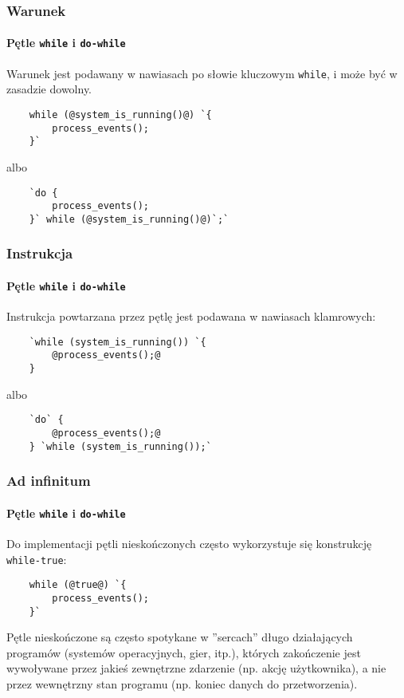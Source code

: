 \documentclass[aspectratio=169]{beamer}
\begin{document}
\begin{frame}[fragile]
    \frametitle{Warunek}
    \framesubtitle{Pętle {\tt while} i {\tt do-while}}

    Warunek jest podawany w nawiasach po słowie kluczowym {\tt while}, i może
    być w zasadzie dowolny.

    \begin{lstlisting}
    while (@system_is_running()@) `{
        process_events();
    }`
    \end{lstlisting}

    albo

    \begin{lstlisting}
    `do {
        process_events();
    }` while (@system_is_running()@)`;`
    \end{lstlisting}
\end{frame}

\begin{frame}[fragile]
    \frametitle{Instrukcja}
    \framesubtitle{Pętle {\tt while} i {\tt do-while}}

    Instrukcja powtarzana przez pętlę jest podawana w nawiasach klamrowych:

    \begin{lstlisting}
    `while (system_is_running()) `{
        @process_events();@
    }
    \end{lstlisting}

    albo

    \begin{lstlisting}
    `do` {
        @process_events();@
    } `while (system_is_running());`
    \end{lstlisting}
\end{frame}

\begin{frame}[fragile]
    \frametitle{Ad infinitum}
    \framesubtitle{Pętle {\tt while} i {\tt do-while}}

    Do implementacji pętli nieskończonych często wykorzystuje się konstrukcję
    {\tt while-true}:

    \begin{lstlisting}
    while (@true@) `{
        process_events();
    }`
    \end{lstlisting}

    Pętle nieskończone są często spotykane w ''sercach'' długo działających
    programów (systemów operacyjnych, gier, itp.), których zakończenie jest
    wywoływane przez jakieś zewnętrzne zdarzenie (np. akcję użytkownika), a nie
    przez wewnętrzny stan programu (np. koniec danych do przetworzenia).
\end{frame}
\end{document}
